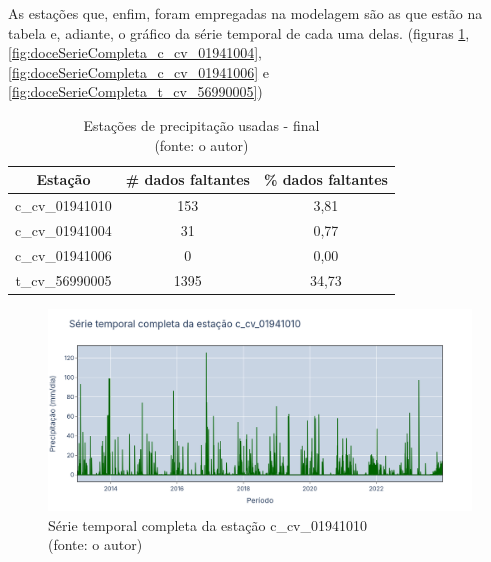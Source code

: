 As estações que, enfim, foram empregadas na modelagem são as que estão na tabela e, adiante, o gráfico da série temporal de cada uma delas. (figuras \ref{fig:doceSerieCompleta_c_cv_01941010}, \ref{fig:doceSerieCompleta_c_cv_01941004}, \ref{fig:doceSerieCompleta_c_cv_01941006} e \ref{fig:doceSerieCompleta_t_cv_56990005})

\begin{table}[h!]
	\centering \small
	\caption{Estações de precipitação usadas - final \\(fonte: o autor)}
	\begin{tabular}{|c|c|c|} \hline
		\textbf{Estação} & \textbf{\# dados faltantes} & \textbf{\% dados faltantes} \\ \hline
		c\_cv\_01941010  & 153                         & 3,81 \\ \hline
		c\_cv\_01941004  & 31                          & 0,77 \\ \hline
		c\_cv\_01941006  & 0                           & 0,00 \\ \hline
		t\_cv\_56990005  & 1395                        & 34,73 \\ \hline
	\end{tabular}
	\label{tab:estacoes_chuva_usadas_final_rio_doce}
\end{table}

\begin{figure}[!h]
	\centering
	\includegraphics[scale=0.25]{Figuras/rio_doce/doceSerieCompleta_c_cv_01941010.png}
	\caption{Série temporal completa da estação c\_cv\_01941010\\(fonte: o autor)}
	\label{fig:doceSerieCompleta_c_cv_01941010}
\end{figure}

